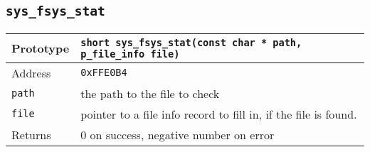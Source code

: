 \subsection*{\texttt{sys\_fsys\_stat}}
\begin{tabular}{|l||l|} \hline
Prototype & \lstinline!short sys_fsys_stat(const char * path, p_file_info file)! \\ \hline
Address & \texttt{0xFFE0B4} \\ \hline
\lstinline!path! & the path to the file to check \\ \hline
\lstinline!file! & pointer to a file info record to fill in, if the file is found. \\ \hline
Returns & 0 on success, negative number on error \\ \hline
\end{tabular}
